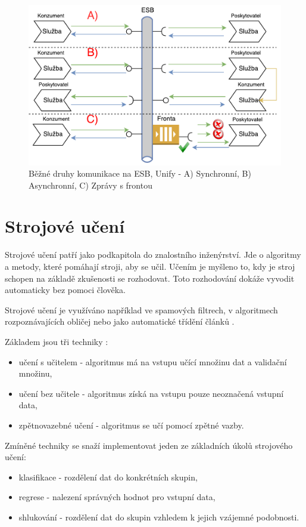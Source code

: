\documentclass[thesis=M,czech]{FITthesis}[2012/10/20]
\newcommand{\tmpframe}[1]{\fbox{#1}}
\renewcommand{\tmpframe}[1]{#1}
\begin{document}
				\begin{figure}[htb]\centering
					\tmpframe{\includegraphics[width=\textwidth]{./img/basic_esb_communication}}		
					\caption{Běžné druhy komunikace na ESB, Unify - A) Synchronní, B) Asynchronní, C) Zprávy s frontou}
					\label{fig:esb_communication}
				\end{figure}
	
	\section{Strojové učení}
		Strojové učení patří jako podkapitola do znalostního inženýrství. Jde o algoritmy a metody, které pomáhají stroji, aby se učil. Učením je myšleno to, kdy je stroj schopen na základě zkušenosti se rozhodovat. Toto rozhodování dokáže vyvodit automaticky bez pomoci člověka. \cite{what-is-machine-learning}
		
		Strojové učení je využíváno například ve spamových filtrech, v algoritmech rozpoznávajících obličej nebo jako automatické třídění článků \cite{machine-learning}.
		
		Základem jsou tři techniky \cite{machin-learning-and-opt}:
		
			\begin{itemize} 
				\item učení s učitelem - algoritmus má na vstupu učící množinu dat a validační množinu,
				\item učení bez učitele - algoritmus získá na vstupu pouze neoznačená vstupní data,
				\item zpětnovazebné učení - algoritmus se učí pomocí zpětné vazby.
			\end{itemize}
		
		Zmíněné techniky se snaží implementovat jeden ze základních úkolů strojového učení:
			\begin{itemize} 
				\item klasifikace - rozdělení dat do konkrétních skupin,
				\item regrese - nalezení správných hodnot pro vstupní data,
				\item shlukování - rozdělení dat do skupin vzhledem k jejich vzájemné podobnosti.
			\end{itemize}
			
\end{document}
